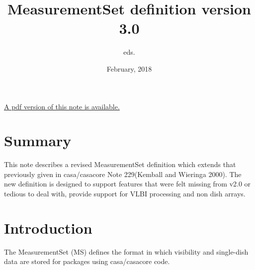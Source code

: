 \documentclass{article}
\begin{document}
\title{MeasurementSet definition version 3.0}
\author{eds.}
\date{February, 2018}
\maketitle

\ifpdf
\else
\href{264.pdf}{A pdf version of this note is available.}
\fi

\tableofcontents 
\section{Summary} 

This note describes a revised MeasurementSet definition which extends
that previously given in casa/casacore Note 229(Kemball and Wieringa
2000).  The new definition is designed to support features that were
felt missing from v2.0 or tedious to deal with, provide support for
VLBI processing and non dish arrays.

\section{Introduction}

The MeasurementSet (MS) defines the format in which visibility and
single-dish data are stored for packages using casa/casacore code.
\end{document}
